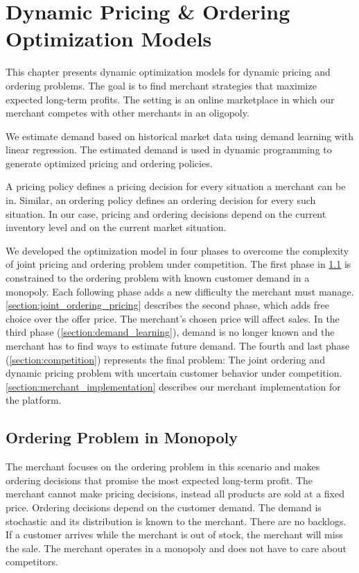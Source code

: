 
\chapter{Dynamic Pricing \& Ordering Optimization Models}
This chapter presents dynamic optimization models for dynamic pricing and ordering problems.
The goal is to find merchant strategies that maximize expected long-term profits.
The setting is an online marketplace in which our merchant competes with other merchants in an oligopoly.

We estimate demand based on historical market data using demand learning with linear regression.
The estimated demand is used in dynamic programming to generate optimized pricing and ordering policies.

A pricing policy defines a pricing decision for every situation a merchant can be in. Similar, an ordering policy defines an ordering decision for every such situation.
In our case, pricing and ordering decisions depend on the current inventory level and on the current market situation.

We developed the optimization model in four phases to overcome the complexity of joint pricing and ordering problem under competition.
The first phase in \cref{section:ordering} is constrained to the ordering problem with known customer demand in a monopoly.
Each following phase adds a new difficulty the merchant must manage.
\cref{section:joint_ordering_pricing} describes the second phase, which adds free choice over the offer price.
The merchant's chosen price will affect sales.
In the third phase (\cref{section:demand_learning}), demand is no longer known and the merchant has to find ways to estimate future demand.
The fourth and last phase (\cref{section:competition}) represents the final problem: The joint ordering and dynamic pricing problem with uncertain customer behavior under competition.
\cref{section:merchant_implementation} describes our merchant implementation for the \pricewars platform.

\section{Ordering Problem in Monopoly}
\label{section:ordering}
The merchant focuses on the ordering problem in this scenario and makes ordering decisions that promise the most expected long-term profit.
The merchant cannot make pricing decisions, instead all products are sold at a fixed price.
Ordering decisions depend on the customer demand.
The demand is stochastic and its distribution is known to the merchant.
There are no backlogs.
If a customer arrives while the merchant is out of stock, the merchant will miss the sale.
The merchant operates in a monopoly and does not have to care about competitors.

